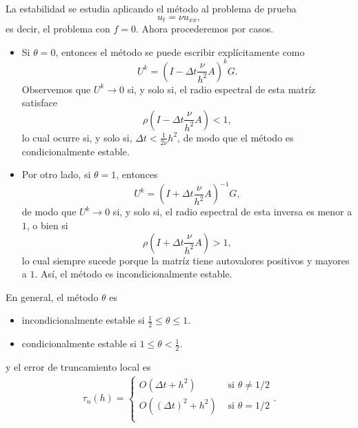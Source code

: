 \documentclass[11pt,letterpaper]{report}
\begin{document}
La estabilidad se estudia aplicando el método al problema de
prueba
\begin{equation}
  u_t = \nu u_{xx}
,\end{equation}
es decir, el problema con $f=0$.
Ahora procederemos por casos.
\begin{itemize}
  \item
    Si $\theta=0$, entonces el método se
    puede escribir explícitamente como
    \begin{equation}
      U^{k}
      =
        \left(
          I-
          \Delta t
          \frac{\nu}{h^{2}}A
        \right)^k
        G
    .\end{equation}
    Observemos que $U^{k}\to 0$ si, y solo si, el radio espectral de esta
    matríz satisface
    \begin{equation}
      \rho
        \left(
          I-
          \Delta t
          \frac{\nu}{h^{2}}A
        \right) < 1
    ,\end{equation}
    lo cual ocurre si, y solo si, $\Delta t < \frac{1}{2\nu}h^{2}$,
    de modo que el método es condicionalmente estable.

  \item
    Por otro lado, si $\theta =1$, entonces
    \begin{equation}
      U^{k}
      =
      \left( I
        +
        \Delta t
        \frac{\nu}{h^{2}}A
      \right)^{-1}
      G
    ,\end{equation}
    de modo que $U^{k}\to 0$ si, y solo si, el radio espectral de
    esta inversa es menor a $1$, o bien si
    \begin{equation}
      \rho
      \left( I
        +
        \Delta t
        \frac{\nu}{h^{2}}A
      \right)
      >1
    ,\end{equation}
    lo cual siempre sucede porque la matríz tiene autovalores
    positivos y mayores a $1$. Así, el método es incondicionalmente
    estable.
\end{itemize}

En general, el método $\theta$ es
\begin{itemize}
  \item
    incondicionalmente estable si $\frac{1}{2}\leq \theta\leq 1$.
  \item
    condicionalmente estable si $1\leq\theta<\frac{1}{2}$.
\end{itemize}
y el error de truncamiento local es
\begin{align}
  \tau_n(h)
  =
  \begin{cases}
    O(\Delta t + h^{2}) & \text{ si } \theta \neq 1 / 2 \\
    O((\Delta t)^{2} + h^{2}) & \text{ si } \theta = 1 / 2 \\
  \end{cases}
.\end{align}
\end{document}
